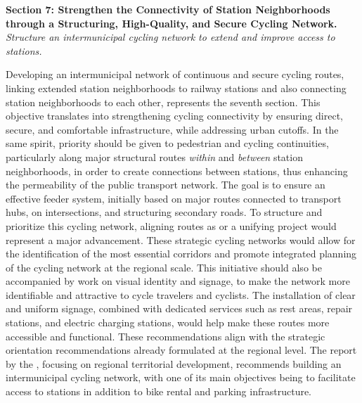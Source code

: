 \begin{refsegment}
    \begin{displayquote}
\textbf{Section 7: Strengthen the Connectivity of Station Neighborhoods through a Structuring, High-Quality, and Secure Cycling Network.}
\\
\textsl{Structure an intermunicipal cycling network to extend and improve access to stations.}
    \end{displayquote}
Developing an intermunicipal network of continuous and secure cycling routes, linking extended station neighborhoods to railway stations and also connecting station neighborhoods to each other, represents the seventh section. This objective translates into strengthening cycling connectivity by ensuring direct, secure, and comfortable infrastructure, while addressing urban cutoffs. In the same spirit, priority should be given to pedestrian and cycling continuities, particularly along major structural routes \textsl{within} and \textsl{between} station neighborhoods, in order to create connections between stations, thus enhancing the permeability of the public transport network. The goal is to ensure an effective feeder system, initially based on major routes connected to transport hubs, on intersections, and structuring secondary roads. To structure and prioritize this cycling network, aligning routes as  or a unifying  project would represent a major advancement. These strategic cycling networks would allow for the identification of the most essential corridors and promote integrated planning of the cycling network at the regional scale. This initiative should also be accompanied by work on visual identity and signage, to make the network more identifiable and attractive to cycle travelers and cyclists. The installation of clear and uniform signage, combined with dedicated services such as rest areas, repair stations, and electric charging stations, would help make these routes more accessible and functional. These recommendations align with the strategic orientation recommendations already formulated at the regional level. The report by the \textcolor{blue}{\textcite[72]{ceser_hauts-de-france_mobilite_2021}}, focusing on regional territorial development, recommends building an intermunicipal cycling network, with one of its main objectives being to facilitate access to stations in addition to bike rental and parking infrastructure.%


\end{refsegment}

